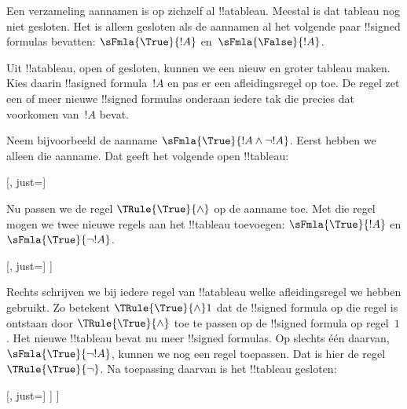 \documentclass[openany]{memoir}
\begin{document}
\begin{ex}
  Een verzameling aannamen is op zichzelf al !!a{tableau}. Meestal is
  dat tableau nog niet gesloten. Het is alleen gesloten als de aannamen
  al het volgende paar !!{signed formula}s bevatten:
  $\sFmla{\True}{!A}$ en~$\sFmla{\False}{!A}$.

  Uit !!a{tableau}, open of gesloten, kunnen we een nieuw en groter
  tableau maken. Kies daarin !!a{signed formula}~$!A$ en pas er een
  afleidingsregel op toe. De regel zet een of meer nieuwe
  !!{signed formula}s onderaan iedere tak die precies dat voorkomen
  van~$!A$ bevat.

  Neem bijvoorbeeld de aanname $\sFmla{\True}{!A \land \lnot
    !A}$. Eerst hebben we alleen die aanname. Dat geeft het volgende
  open !!{tableau}:
  \begin{center}
    \begin{tableau}{}
      [, just=\TAss]
    \end{tableau}{}
  \end{center}
  Nu passen we de regel $\TRule{\True}{\land}$ op de aanname toe. Met
  die regel mogen we twee nieuwe regels aan het !!{tableau} toevoegen:
  $\sFmla{\True}{!A}$ en $\sFmla{\True}{\lnot !A}$.
  \begin{center}
    \begin{tableau}{}
      [, just=\TAss
        [\sFmla{\True}{\formula{A}}, just={\TRule{\True}{\land}[1]},
          [\sFmla{\True}{\lnot \formula{A}}, just={\TRule{\True}{\land}[1]}
          ]
        ]
      ]
    \end{tableau}{}
  \end{center}
  Rechts schrijven we bij iedere regel van !!a{tableau} welke
  afleidingsregel we hebben gebruikt. Zo betekent
  $\TRule{\True}{\land} 1$ dat de !!{signed formula} op die regel is
  ontstaan door $\TRule{\True}{\land}$ toe te passen op de
  !!{signed formula} op regel~$1$. Het nieuwe !!{tableau} bevat nu meer
  !!{signed formula}s. Op slechts één daarvan,
  $\sFmla{\True}{\lnot !A}$, kunnen we nog een regel toepassen. Dat is
  hier de regel $\TRule{\True}{\lnot}$. Na toepassing daarvan is het
  !!{tableau} gesloten:
  \begin{center}
    \begin{tableau}{}
      [, just=\TAss
        [\sFmla{\True}{\formula{A}}, just={\TRule{\True}{\land}[1]}
          [\sFmla{\True}{\lnot \formula{A}}, just={\TRule{\True}{\land}[1]}
            [\sFmla{\False}{\formula{A}}, just={\TRule{\True}{\lnot}[3]}, close]
          ]
        ]
      ]
    \end{tableau}{}
  \end{center}
\end{ex}
\endgroup
\end{document}
